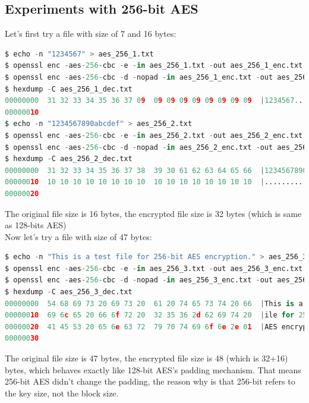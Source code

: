 \documentclass{article}
\begin{document}
\subsection{Experiments with 256-bit AES}
Let's first try a file with size of 7 and 16 bytes:
\begin{lstlisting}[language=Python]
$ echo -n "1234567" > aes_256_1.txt
$ openssl enc -aes-256-cbc -e -in aes_256_1.txt -out aes_256_1_enc.txt -K 00112233445566778889aabbccddeeff00112233445566778889aabbccddeeff -iv 0102030405060708090a0b0c0d0e0f10
$ openssl enc -aes-256-cbc -d -nopad -in aes_256_1_enc.txt -out aes_256_1_dec.txt -K 00112233445566778889aabbccddeeff00112233445566778889aabbccddeeff -iv 0102030405060708090a0b0c0d0e0f10
$ hexdump -C aes_256_1_dec.txt
00000000  31 32 33 34 35 36 37 09  09 09 09 09 09 09 09 09  |1234567.........|
00000010
$ echo -n "1234567890abcdef" > aes_256_2.txt
$ openssl enc -aes-256-cbc -e -in aes_256_2.txt -out aes_256_2_enc.txt -K 00112233445566778889aabbccddeeff00112233445566778889aabbccddeeff -iv 0102030405060708090a0b0c0d0e0f10
$ openssl enc -aes-256-cbc -d -nopad -in aes_256_2_enc.txt -out aes_256_2_dec.txt -K 00112233445566778889aabbccddeeff00112233445566778889aabbccddeeff -iv 0102030405060708090a0b0c0d0e0f10
$ hexdump -C aes_256_2_dec.txt
00000000  31 32 33 34 35 36 37 38  39 30 61 62 63 64 65 66  |1234567890abcdef|
00000010  10 10 10 10 10 10 10 10  10 10 10 10 10 10 10 10  |................|
00000020
\end{lstlisting}
The original file size is 16 bytes, the encrypted file size is 32 bytes (which is same as 128-bits AES)\\
Now let's try a file with size of 47 bytes:
\begin{lstlisting}[language=Python]
$ echo -n "This is a test file for 256-bit AES encryption." > aes_256_3.txt
$ openssl enc -aes-256-cbc -e -in aes_256_3.txt -out aes_256_3_enc.txt -K 00112233445566778889aabbccddeeff00112233445566778889aabbccddeeff -iv 0102030405060708090a0b0c0d0e0f10
$ openssl enc -aes-256-cbc -d -nopad -in aes_256_3_enc.txt -out aes_256_3_dec.txt -K 00112233445566778889aabbccddeeff00112233445566778889aabbccddeeff -iv 0102030405060708090a0b0c0d0e0f10
$ hexdump -C aes_256_3_dec.txt
00000000  54 68 69 73 20 69 73 20  61 20 74 65 73 74 20 66  |This is a test f|
00000010  69 6c 65 20 66 6f 72 20  32 35 36 2d 62 69 74 20  |ile for 256-bit |
00000020  41 45 53 20 65 6e 63 72  79 70 74 69 6f 6e 2e 01  |AES encryption..|
00000030
\end{lstlisting}
The original file size is 47 bytes, the encrypted file size is 48 (which is 32+16) bytes, which
behaves exactly like 128-bit AES's padding mechanism. That means 256-bit AES didn't change the
padding, the reason why is that 256-bit refers to the key size, not the block size.
\end{document}
